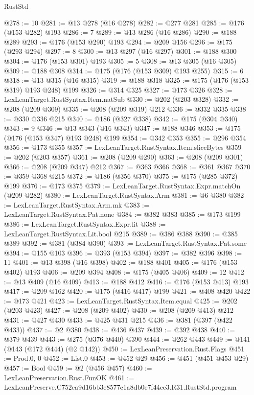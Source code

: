 \begin{lexlean}{RustStd}
\begin{coremodule}
@278 := 10
@281 := @13 @278 (@16 @278)
@282 := @277 @281
@285 := @176 (@153 @282) @193
@286 := 7
@289 := @13 @286 (@16 @286)
@290 := @188 @289
@293 := @176 (@153 @290) @193
@294 := @209 @156
@296 := @175 (@293 @294)
@297 := 8
@300 := @13 @297 (@16 @297)
@301 := @188 @300
@304 := @176 (@153 @301) @193
@305 := 5
@308 := @13 @305 (@16 @305)
@309 := @188 @308
@314 := @175 (@176 (@153 @309) @193 @255)
@315 := 6
@318 := @13 @315 (@16 @315)
@319 := @188 @318
@325 := @175 (@176 (@153 @319) @193 @248) @199
@326 := @314 @325
@327 := @173 @326
@328 := LexLeanTarget.RustSyntax.Item.natSub
@330 := @202 (@203 @328)
@332 := @208 (@209 @309)
@335 := @208 (@209 @319) @212
@336 := @332 @335
@338 := @330 @336 @215
@340 := @186 (@327 @338)
@342 := @175 (@304 @340)
@343 := 9
@346 := @13 @343 (@16 @343)
@347 := @188 @346
@353 := @175 (@176 (@153 @347) @193 @248) @199
@354 := @342 @353
@355 := @296 @354
@356 := @173 @355
@357 := LexLeanTarget.RustSyntax.Item.sliceBytes
@359 := @202 (@203 @357)
@361 := @208 (@209 @290)
@363 := @208 (@209 @301)
@366 := @208 (@209 @347) @212
@367 := @363 @366
@368 := @361 @367
@370 := @359 @368 @215
@372 := @186 (@356 @370)
@375 := @175 (@285 @372) @199
@376 := @173 @375
@379 := LexLeanTarget.RustSyntax.Expr.matchOn (@209 @282)
@380 := LexLeanTarget.RustSyntax.Arm
@381 := @6 @380
@382 := LexLeanTarget.RustSyntax.Arm.mk
@383 := LexLeanTarget.RustSyntax.Pat.none
@384 := @382 @383
@385 := @173 @199
@386 := LexLeanTarget.RustSyntax.Expr.lit
@388 := LexLeanTarget.RustSyntax.Lit.bool @215
@389 := @386 @388
@390 := @385 @389
@392 := @381 (@384 @390)
@393 := LexLeanTarget.RustSyntax.Pat.some
@394 := @155 @103
@396 := @393 (@153 @394)
@397 := @382 @396
@398 := 11
@401 := @13 @398 (@16 @398)
@402 := @188 @401
@405 := @176 (@153 @402) @193
@406 := @209 @394
@408 := @175 (@405 @406)
@409 := 12
@412 := @13 @409 (@16 @409)
@413 := @188 @412
@416 := @176 (@153 @413) @193
@417 := @209 @162
@420 := @175 (@416 @417) @199
@421 := @408 @420
@422 := @173 @421
@423 := LexLeanTarget.RustSyntax.Item.equal
@425 := @202 (@203 @423)
@427 := @208 (@209 @402)
@430 := @208 (@209 @413) @212
@431 := @427 @430
@433 := @425 @431 @215
@436 := @381 (@397 (@422 @433))
@437 := @2 @380
@438 := @436 @437
@439 := @392 @438
@440 := @379 @439
@443 := @275 (@376 @440) @390
@444 := @262 @443
@449 := @141 (@143 (@172 @444) (@2 @142))
@450 := LexLeanPreservation.Rust.Flags
@451 := Prod.{0, 0}
@452 := List.{0}
@453 := @452 @29
@456 := @451 (@451 @453 @29)
@457 := Bool
@459 := @2 (@456 @457)
@460 := LexLeanPreservation.Rust.FunOK
@461 := LexLeanPreserve.C752ea9d16bb3e8577c1a8db0e7f44ec3.R31.RustStd.program

\end{coremodule}
\end{lexlean}
